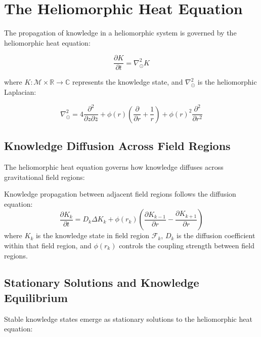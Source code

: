 \section{The Heliomorphic Heat Equation}

The propagation of knowledge in a heliomorphic system is governed by the heliomorphic heat equation:

\begin{equation}
\frac{\partial K}{\partial t} = \nabla_{\odot}^2 K
\end{equation}

where $K: \mathcal{M} \times \mathbb{R} \rightarrow \mathbb{C}$ represents the knowledge state, and $\nabla_{\odot}^2$ is the heliomorphic Laplacian:

\begin{equation}
\nabla_{\odot}^2 = 4\frac{\partial^2}{\partial z \partial \bar{z}} + \phi(r)\left(\frac{\partial}{\partial r} + \frac{1}{r}\right) + \phi(r)^2\frac{\partial^2}{\partial r^2}
\end{equation}

\subsection{Knowledge Diffusion Across Field Regions}

The heliomorphic heat equation governs how knowledge diffuses across gravitational field regions:

\begin{theorem}
Knowledge propagation between adjacent field regions follows the diffusion equation:
\begin{equation}
\frac{\partial K_k}{\partial t} = D_k \Delta K_k + \phi(r_k) \left(\frac{\partial K_{k-1}}{\partial r} - \frac{\partial K_{k+1}}{\partial r}\right)
\end{equation}
where $K_k$ is the knowledge state in field region $\mathcal{F}_k$, $D_k$ is the diffusion coefficient within that field region, and $\phi(r_k)$ controls the coupling strength between field regions.
\end{theorem}

\subsection{Stationary Solutions and Knowledge Equilibrium}

Stable knowledge states emerge as stationary solutions to the heliomorphic heat equation:

